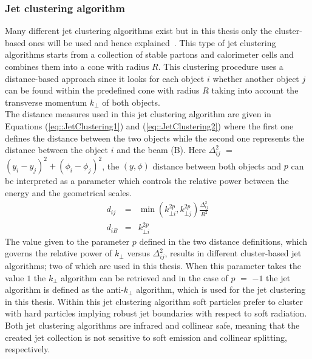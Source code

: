 \subsubsection*{Jet clustering algorithm}
Many different jet clustering algorithms exist but in this thesis only the cluster-based ones will be used and hence explained~\cite{}. This type of jet clustering algorithms starts from a collection of stable partons and calorimeter cells and combines them into a cone with radius $R$. This clustering procedure uses a distance-based approach since it looks for each object $i$ whether another object $j$ can be found within the predefined cone with radius $R$ taking into account the transverse momentum $k_{\bot}$ of both objects.
\\
The distance measures used in this jet clustering algorithm are given in Equations (\ref{eq::JetClustering1}) and (\ref{eq::JetClustering2}) where the first one defines the distance between the two objects while the second one represents the distance between the object $i$ and the beam (B). Here $\Delta_{ij}^{2}$ $=$ $(y_i - y_j)^{2} + (\phi_i - \phi_j)^2$, the $(y,\phi)$ distance between both objects and $p$ can be interpreted as a parameter which controls the relative power between the energy and the geometrical scales.
\\
\begin{eqnarray}
 d_{ij} & = & \min(k_{\bot i}^{2p}, k_{\bot j}^{2p}) \frac{\Delta_{ij}^{2}}{R^{2}} \label{eq::JetClustering1} \\
 d_{iB} & = & k_{\bot i}^{2p}                                                      \label{eq::JetClustering2}
\end{eqnarray}
The value given to the parameter $p$ defined in the two distance definitions, which governs the relative power of $k_{\bot}$ versus $\Delta_{ij}^{2}$, results in different cluster-based jet algorithms; two of which are used in this thesis. When this parameter takes the value $1$ the $k_{\bot}$ algorithm can be retrieved and in the case of $p$ $=$ $-1$ the jet algorithm is defined as the anti-$k_{\bot}$ algorithm, which is used for the jet clustering in this thesis. %
Within this jet clustering algorithm soft particles prefer to cluster with hard particles implying robust jet boundaries with respect to soft radiation. Both jet clustering algorithms are infrared and collinear safe, meaning that the created jet collection is not sensitive to soft emission and collinear splitting, respectively.
\\

